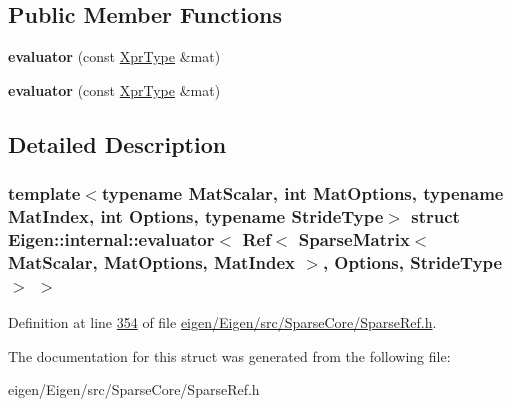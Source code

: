 \subsection*{Public Member Functions}
\begin{DoxyCompactItemize}
\item 
\mbox{\label{struct_eigen_1_1internal_1_1evaluator_3_01_ref_3_01_sparse_matrix_3_01_mat_scalar_00_01_mat_opti1f146c69a21d0c41f4f1c116a0c5fce2_a0cccc9f11f1d108fa14ab95ff4459f57}} 
{\bfseries evaluator} (const \hyperlink{group___sparse_core___module_class_eigen_1_1_ref_3_01_sparse_matrix_3_01_mat_scalar_00_01_mat_options_00_01_mat_index_01_4_0024ec28acf7b4e76d8ff99a0bdc39c296}{Xpr\+Type} \&mat)
\item 
\mbox{\label{struct_eigen_1_1internal_1_1evaluator_3_01_ref_3_01_sparse_matrix_3_01_mat_scalar_00_01_mat_opti1f146c69a21d0c41f4f1c116a0c5fce2_a0cccc9f11f1d108fa14ab95ff4459f57}} 
{\bfseries evaluator} (const \hyperlink{group___sparse_core___module_class_eigen_1_1_ref_3_01_sparse_matrix_3_01_mat_scalar_00_01_mat_options_00_01_mat_index_01_4_0024ec28acf7b4e76d8ff99a0bdc39c296}{Xpr\+Type} \&mat)
\end{DoxyCompactItemize}


\subsection{Detailed Description}
\subsubsection*{template$<$typename Mat\+Scalar, int Mat\+Options, typename Mat\+Index, int Options, typename Stride\+Type$>$\newline
struct Eigen\+::internal\+::evaluator$<$ Ref$<$ Sparse\+Matrix$<$ Mat\+Scalar, Mat\+Options, Mat\+Index $>$, Options, Stride\+Type $>$ $>$}



Definition at line \hyperlink{eigen_2_eigen_2src_2_sparse_core_2_sparse_ref_8h_source_l00354}{354} of file \hyperlink{eigen_2_eigen_2src_2_sparse_core_2_sparse_ref_8h_source}{eigen/\+Eigen/src/\+Sparse\+Core/\+Sparse\+Ref.\+h}.



The documentation for this struct was generated from the following file\+:\begin{DoxyCompactItemize}
\item 
eigen/\+Eigen/src/\+Sparse\+Core/\+Sparse\+Ref.\+h\end{DoxyCompactItemize}
